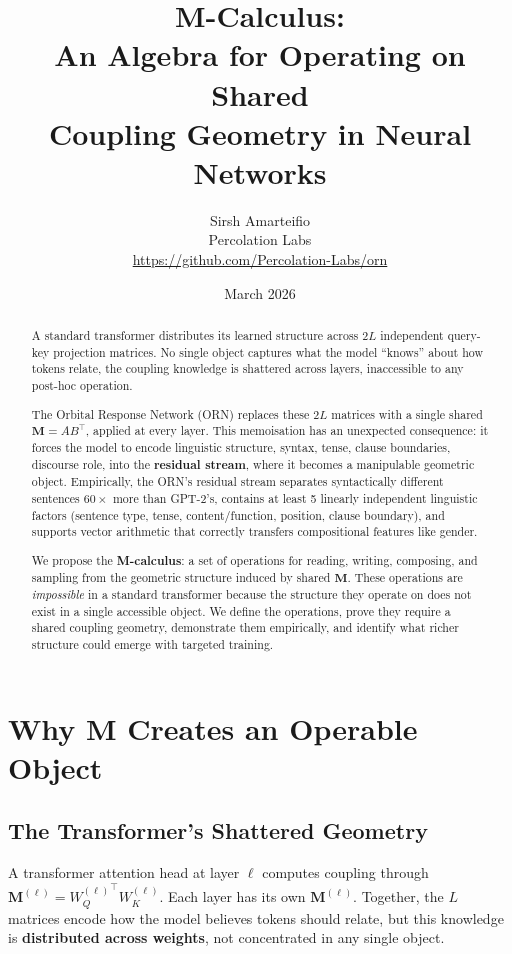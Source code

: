 \documentclass[11pt, a4paper]{article}
\title{%
    \textbf{M-Calculus:}\\[4pt]
    \Large An Algebra for Operating on Shared\\
    Coupling Geometry in Neural Networks%
}
\author{%
    Sirsh Amarteifio\\
    {\small Percolation Labs}\\
    {\small \url{https://github.com/Percolation-Labs/orn}}%
}
\date{March 2026 \quad{\small\textnormal{,  Working Document}}}
\newcommand{\M}{\mathbf{M}}
\theoremstyle{plain}
\theoremstyle{definition}
\theoremstyle{remark}
\begin{document}
\maketitle

\begin{abstract}
A standard transformer distributes its learned structure across $2L$ independent query-key projection matrices.
No single object captures what the model ``knows'' about how tokens relate, the coupling knowledge is shattered across layers, inaccessible to any post-hoc operation.

The Orbital Response Network (ORN) replaces these $2L$ matrices with a single shared $\M = AB^\top$, applied at every layer.
This memoisation has an unexpected consequence: it forces the model to encode linguistic structure, syntax, tense, clause boundaries, discourse role, into the \textbf{residual stream}, where it becomes a manipulable geometric object.
Empirically, the ORN's residual stream separates syntactically different sentences $60\times$ more than GPT-2's, contains at least 5 linearly independent linguistic factors (sentence type, tense, content/function, position, clause boundary), and supports vector arithmetic that correctly transfers compositional features like gender.

We propose the \textbf{M-calculus}: a set of operations for reading, writing, composing, and sampling from the geometric structure induced by shared $\M$.
These operations are \emph{impossible} in a standard transformer because the structure they operate on does not exist in a single accessible object.
We define the operations, prove they require a shared coupling geometry, demonstrate them empirically, and identify what richer structure could emerge with targeted training.
\end{abstract}

\section{Why M Creates an Operable Object}
\label{sec:why}

\subsection{The Transformer's Shattered Geometry}

A transformer attention head at layer $\ell$ computes coupling through $\M^{(\ell)} = {W_Q^{(\ell)}}^\top W_K^{(\ell)}$.
Each layer has its own $\M^{(\ell)}$.
Together, the $L$ matrices encode how the model believes tokens should relate, but this knowledge is \textbf{distributed across weights}, not concentrated in any single object.
\end{document}
